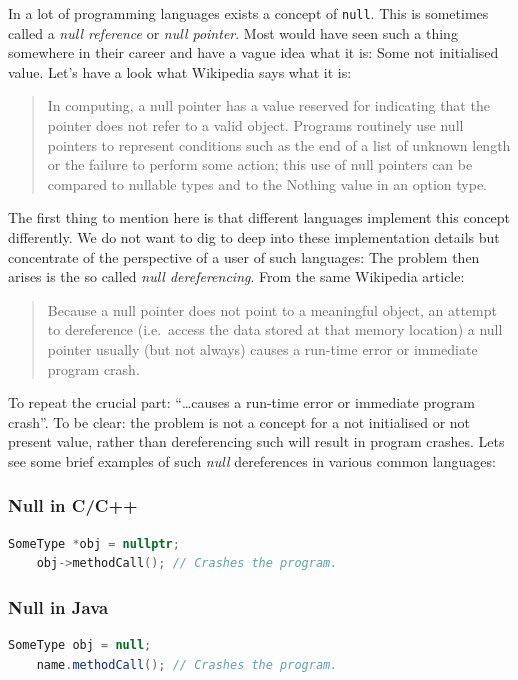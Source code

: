 \documentclass[11pt, a4paper]{report}
\begin{document}
In a lot of programming languages exists a concept of \texttt{null}. This is sometimes called a \textit{null reference} or \textit{null pointer}. Most would have seen such a thing somewhere in their career and have a vague idea what it is: Some not initialised value. Let's have a look what Wikipedia\cite{null-wiki} says what it is:

\begin{quotation}
    In computing, a null pointer has a value reserved for indicating that the pointer does not refer to a valid object. Programs routinely use null pointers to represent conditions such as the end of a list of unknown length or the failure to perform some action; this use of null pointers can be compared to nullable types and to the Nothing value in an option type.
\end{quotation}

The first thing to mention here is that different languages implement this concept differently. We do not want to dig to deep into these implementation details but concentrate of the perspective of a user of such languages: The problem then arises is the so called \textit{null dereferencing}. From the same Wikipedia\cite{null-wiki} article:

\begin{quotation}
    Because a null pointer does not point to a meaningful object, an attempt to dereference (i.e.\ access the data stored at that memory location) a null pointer usually (but not always) causes a run-time error or immediate program crash.
\end{quotation}

To repeat the crucial part: ``\ldots causes a run-time error or immediate program crash''. To be clear: the problem is not a concept for a not initialised or not present value, rather than dereferencing such will result in program crashes. Lets see some brief examples of such \textit{null} dereferences in various common languages:

\subsubsection{Null in C/C++}
\begin{lstlisting}[language=C++]
    SomeType *obj = nullptr;
    obj->methodCall(); // Crashes the program.
\end{lstlisting}

\subsubsection{Null in Java}
\begin{lstlisting}[language=Java]
    SomeType obj = null;
    name.methodCall(); // Crashes the program.
\end{lstlisting}
\end{document}
